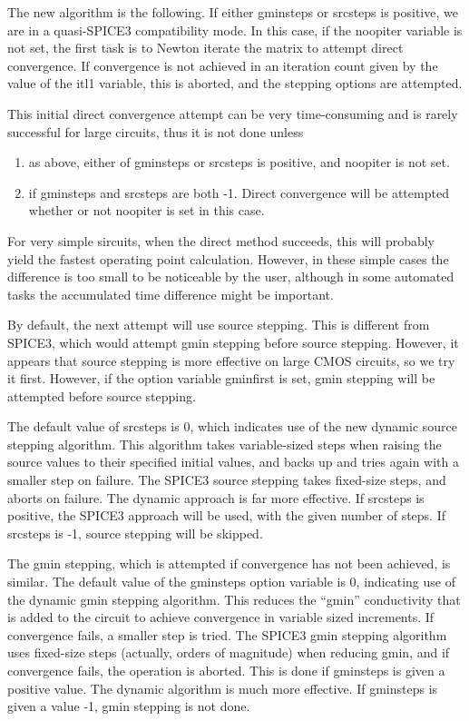 The new algorithm is the following.  If either {\et gminsteps} or {\et
srcsteps} is positive, we are in a quasi-SPICE3 compatibility mode. 
In this case, if the {\et noopiter} variable is not set, the first
task is to Newton iterate the matrix to attempt direct convergence. 
If convergence is not achieved in an iteration count given by the
value of the {\et itl1} variable, this is aborted, and the stepping
options are attempted.

This initial direct convergence attempt can be very time-consuming and
is rarely successful for large circuits, thus it is not done unless
\begin{enumerate}
\item{as above, either of {\et gminsteps} or {\et srcsteps} is
positive, and {\et noopiter} is not set.}
\item{if {\et gminsteps} and {\et srcsteps} are both -1.  Direct
convergence will be attempted whether or not {\et noopiter} is
set in this case.}
\end{enumerate}

For very simple sircuits, when the direct method succeeds, this will
probably yield the fastest operating point calculation.  However, in
these simple cases the difference is too small to be noticeable by the
user, although in some automated tasks the accumulated time difference
might be important.

By default, the next attempt will use source stepping.  This is
different from SPICE3, which would attempt gmin stepping before source
stepping.  However, it appears that source stepping is more effective
on large CMOS circuits, so we try it first.  However, if the option
variable {\et gminfirst} is set, gmin stepping will be attempted
before source stepping.

The default value of {\et srcsteps} is 0, which indicates use of the
new dynamic source stepping algorithm.  This algorithm takes
variable-sized steps when raising the source values to their specified
initial values, and backs up and tries again with a smaller step on
failure.  The SPICE3 source stepping takes fixed-size steps, and
aborts on failure.  The dynamic approach is far more effective.  If
{\et srcsteps} is positive, the SPICE3 approach will be used, with the
given number of steps.  If {\et srcsteps} is -1, source stepping will
be skipped.

The gmin stepping, which is attempted if convergence has not been
achieved, is similar.  The default value of the {\et gminsteps} option
variable is 0, indicating use of the dynamic gmin stepping algorithm. 
This reduces the ``gmin'' conductivity that is added to the circuit to
achieve convergence in variable sized increments.  If convergence
fails, a smaller step is tried.  The SPICE3 gmin stepping algorithm
uses fixed-size steps (actually, orders of magnitude) when reducing
gmin, and if convergence fails, the operation is aborted.  This is
done if {\et gminsteps} is given a positive value.  The dynamic
algorithm is much more effective.  If {\et gminsteps} is given a value
-1, gmin stepping is not done.

